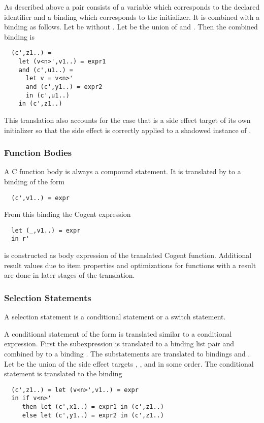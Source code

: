 As described above a pair consists of a variable  which corresponds to the declared identifier and a binding 
 which corresponds to the initializer. It is combined with a binding  as follows. 
Let  be  without . Let  be the union of  and . Then the
combined binding is
\begin{verbatim}
  (c',z1..) = 
    let (v<n>',v1..) = expr1
    and (c',u1..) = 
      let v = v<n>'
      and (c',y1..) = expr2
      in (c',u1..)
    in (c',z1..)
\end{verbatim}
This translation also accounts for the case that  is a side effect target of its own initializer so that the side effect is
correctly applied to a shadowed instance of .

\subsubsection{Function Bodies}

A C function body is always a compound statement. It is translated by  to a 
binding of the form
\begin{verbatim}
  (c',v1..) = expr
\end{verbatim}

From this binding the Cogent expression
\begin{verbatim}
  let (_,v1..) = expr
  in r'
\end{verbatim}
is constructed as body expression of the translated Cogent function. Additional result values due to item 
properties and optimizations for functions with a  result are done in later stages of the translation.

\subsubsection{Selection Statements}

A selection statement is a conditional statement or a switch statement.

A conditional statement of the form  is translated similar to a conditional expression.
First the subexpression  is translated to a binding list pair and combined by  to a binding 
. The substatements are translated to bindings  and . 
Let  be the union of the side effect targets , , and  in some order. The conditional
statement is translated to the binding
\begin{verbatim}
  (c',z1..) = let (v<n>',v1..) = expr
  in if v<n>' 
     then let (c',x1..) = expr1 in (c',z1..)
     else let (c',y1..) = expr2 in (c',z1..)
\end{verbatim}

